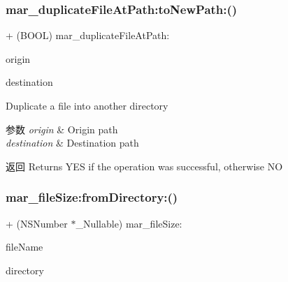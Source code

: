 \mbox{\label{category_n_s_file_manager_07_m_a_r_e_x_08_a277c71b49acb2fee7a277907bdae8b38}} 
\subsubsection{\texorpdfstring{mar\+\_\+duplicate\+File\+At\+Path\+:to\+New\+Path\+:()}{mar\_duplicateFileAtPath:toNewPath:()}}
{\footnotesize\ttfamily + (B\+O\+OL) mar\+\_\+duplicate\+File\+At\+Path\+: \begin{DoxyParamCaption}\item[{(N\+S\+String $\ast$ \+\_\+\+Nonnull)}]{origin }\item[{toNewPath:(N\+S\+String $\ast$ \+\_\+\+Nonnull)}]{destination }\end{DoxyParamCaption}}

Duplicate a file into another directory


\begin{DoxyParams}{参数}
{\em origin} & Origin path \\
\hline
{\em destination} & Destination path\\
\hline
\end{DoxyParams}
\begin{DoxyReturn}{返回}
Returns Y\+ES if the operation was successful, otherwise NO 
\end{DoxyReturn}
\mbox{\label{category_n_s_file_manager_07_m_a_r_e_x_08_a2b6ca963f97ef62f68eb60a5f7bdb175}} 
\subsubsection{\texorpdfstring{mar\+\_\+file\+Size\+:from\+Directory\+:()}{mar\_fileSize:fromDirectory:()}}
{\footnotesize\ttfamily + (N\+S\+Number $\ast$\+\_\+\+Nullable) mar\+\_\+file\+Size\+: \begin{DoxyParamCaption}\item[{(N\+S\+String $\ast$ \+\_\+\+Nonnull)}]{file\+Name }\item[{fromDirectory:(M\+A\+R\+Directory\+Type)}]{directory }\end{DoxyParamCaption}}

